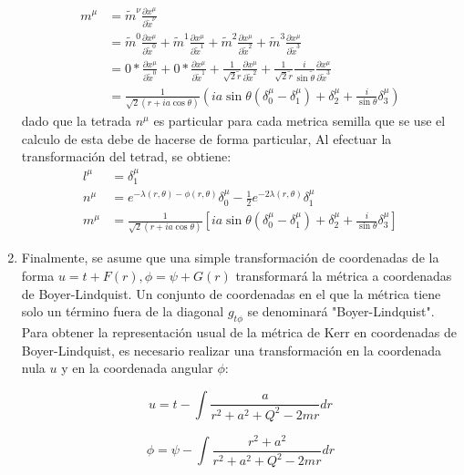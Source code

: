 \begin{enumerate}[1]
            \begin{equation}
                \begin{aligned}
                    m^\mu & =\tilde{m}^\nu \frac{\partial x^\mu}{\partial \tilde{x}^\nu}                                                                                   \\
                            & =\tilde{m}^0 \frac{\partial x^\mu}{\partial \tilde{x}^0}+\tilde{m}^1 \frac{\partial x^\mu}{\partial \tilde{x}^1}+\tilde{m}^2 \frac{\partial x^\mu}{\partial \tilde{x}^2}+\tilde{m}^3 \frac{\partial x^\mu}{\partial \tilde{x}^3}\\
                            & = 0* \frac{\partial x^\mu}{\partial \tilde{x}^0} + 0* \frac{\partial x^\mu}{\partial \tilde{x}^1} +\frac{1}{\sqrt{2} \tilde{r}}\frac{\partial x^\mu}{\partial \tilde{x}^2} + \frac{1}{\sqrt{2} \tilde{r}}\frac{i}{\sin \tilde{\theta}}\frac{\partial x^\mu}{\partial \tilde{x}^3}\\
                            &=\frac{1}{\sqrt{2}(r+i a \cos \theta)}\left(i a \sin \theta\left(\delta_0^\mu-\delta_1^\mu\right)+\delta_2^\mu+\frac{i}{\sin \theta} \delta_3^\mu\right)
                \end{aligned}
            \end{equation}
            dado que la tetrada $n^\mu$ es particular para cada metrica semilla que se use el calculo de esta debe de hacerse de forma particular, 
          Al efectuar la transformación del tetrad, se obtiene:
          \begin{equation}
              \begin{aligned}
                  l^\mu & =\delta_1^\mu                                                                                                                                            \\
                  n^\mu & =e^{-\lambda(r, \theta)-\phi(r, \theta)} \delta_0^\mu-\frac{1}{2} e^{-2 \lambda(r, \theta)} \delta_1^\mu                                                 \\
                  m^\mu & =\frac{1}{\sqrt{2}(r+i a \cos \theta)}\left[i a \sin \theta\left(\delta_0^\mu-\delta_1^\mu\right)+\delta_2^\mu+\frac{i}{\sin \theta} \delta_3^\mu\right]
              \end{aligned}
          \end{equation}



    \item Finalmente, se asume que una simple transformación de coordenadas de la forma $u=t+F(r), \phi=\psi+G(r)$ transformará la métrica a coordenadas de Boyer-Lindquist. Un conjunto de coordenadas en el que la métrica tiene solo un término fuera de la diagonal $g_{t \phi}$ se denominará "Boyer-Lindquist".
          Para obtener la representación usual de la métrica de Kerr en coordenadas de Boyer-Lindquist, es necesario realizar una transformación en la coordenada nula $u$ y en la coordenada angular $\phi$:

          $$
              u=t-\int \frac{a}{r^2+a^2+Q^2-2 m r} d r
          $$

          $$
              \phi=\psi-\int \frac{r^2+a^2}{r^2+a^2+Q^2-2 m r} d r
          $$

\end{enumerate}
